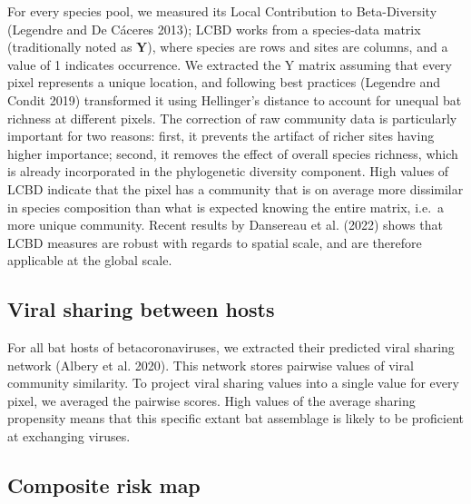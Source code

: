 \documentclass[10pt,oneside]{article}
\begin{document}
For every species pool, we measured its Local Contribution to
Beta-Diversity (Legendre and De Cáceres 2013); LCBD works from a
species-data matrix (traditionally noted as \(\mathbf{Y}\)), where
species are rows and sites are columns, and a value of 1 indicates
occurrence. We extracted the Y matrix assuming that every pixel
represents a unique location, and following best practices (Legendre and
Condit 2019) transformed it using Hellinger's distance to account for
unequal bat richness at different pixels. The correction of raw
community data is particularly important for two reasons: first, it
prevents the artifact of richer sites having higher importance; second,
it removes the effect of overall species richness, which is already
incorporated in the phylogenetic diversity component. High values of
LCBD indicate that the pixel has a community that is on average more
dissimilar in species composition than what is expected knowing the
entire matrix, i.e.~a more unique community. Recent results by Dansereau
et al. (2022) shows that LCBD measures are robust with regards to
spatial scale, and are therefore applicable at the global scale.

\hypertarget{viral-sharing-between-hosts}{%
\subsection{Viral sharing between
hosts}\label{viral-sharing-between-hosts}}

For all bat hosts of betacoronaviruses, we extracted their predicted
viral sharing network (Albery et al. 2020). This network stores pairwise
values of viral community similarity. To project viral sharing values
into a single value for every pixel, we averaged the pairwise scores.
High values of the average sharing propensity means that this specific
extant bat assemblage is likely to be proficient at exchanging viruses.

\hypertarget{composite-risk-map}{%
\subsection{Composite risk map}\label{composite-risk-map}}
\end{document}
